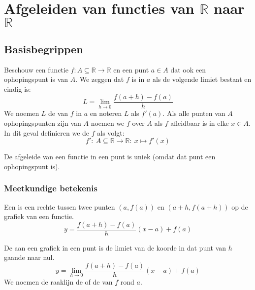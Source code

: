 \documentclass[main.tex]{subfiles}
\begin{document}
\chapter{Afgeleiden van functies van $\mathbb{R}$ naar $\mathbb{R}$}
\label{cha:afgel-van-funct}

\section{Basisbegrippen}
\label{sec:basisbegrippen}

\begin{de}
  Beschouw een functie $f: A \subseteq \mathbb{R} \rightarrow \mathbb{R}$ en een punt $a\in A$ dat ook een ophopingspunt is van $A$.
  We zeggen dat $f$  is in $a$ als de volgende limiet bestaat en eindig is:
  \[ L = \lim_{h\rightarrow 0}\frac{f(a+h)-f(a)}{h} \]
  We noemen $L$ de  van $f$ in $a$ en noteren $L$ als $f'(a)$.
  Als alle punten van $A$ ophopingspunten zijn van $A$ noemen we $f$  over $A$ als $f$ afleidbaar is in elke $x\in A$.
  In dit geval definieren we de  $f$ als volgt:
  \[ f':\ A \subseteq \mathbb{R} \rightarrow \mathbb{R}:\ x \mapsto f'(x) \]
\end{de}

\begin{st}
  De afgeleide van een functie in een punt is uniek (omdat dat punt een ophopingspunt is).
\end{st}


\subsection{Meetkundige betekenis}
\label{sec:meetk-betek}

\begin{de}
  Een  is een rechte tussen twee punten $(a,f(a))$ en $(a+h,f(a+h))$ op de grafiek van een functie.
  \[ y = \frac{f(a+h) -f(a)}{h} (x-a) + f(a) \]
\end{de}

\begin{de}
  De  aan een grafiek in een punt is de limiet van de koorde in dat punt van $h$ gaande naar nul.
  \[ y = \lim_{h\rightarrow 0}\frac{f(a+h) -f(a)}{h} (x-a) + f(a) \]
  We noemen de raaklijn de  of de  van $f$ rond $a$.
\end{de}
\end{document}
